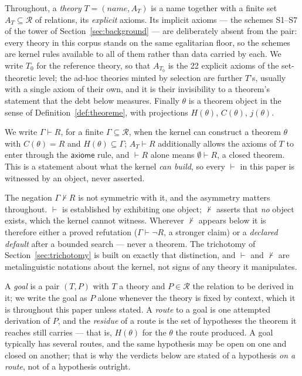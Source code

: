 \documentclass[11pt]{article}
\theoremstyle{remark}\newtheorem{example}{Example}
\begin{document}
Throughout, a \emph{theory} $T = (\mathit{name}, A_T)$ is a name together with a finite
set $A_T \subseteq \mathcal{R}$ of relations, its \emph{explicit} axioms. Its implicit
axioms --- the schemes S1--S7 of the tower of Section~\ref{sec:background} --- are
deliberately absent from the pair: every theory in this corpus stands on the same
egalitarian floor, so the schemes are kernel rules available to all of them rather than
data carried by each. We write $T_0$ for the reference theory, so that $A_{T_0}$ is the
22 explicit axioms of the set-theoretic level; the ad-hoc theories minted by
selection are further $T$'s, usually with a single axiom of their own, and it is their
invisibility to a theorem's statement that the debt below measures. Finally $\theta$ is
a theorem object in the sense of Definition~\ref{def:theoreme}, with projections
$H(\theta)$, $C(\theta)$, $j(\theta)$.

We write $\Gamma \vdash R$, for a finite $\Gamma \subseteq \mathcal{R}$, when the
kernel can construct a theorem $\theta$ with $C(\theta) = R$ and
$H(\theta) \subseteq \Gamma$; $A_T \vdash R$ additionally allows the axioms of $T$ to
enter through the $\mathsf{axiome}$ rule, and $\vdash R$ alone means $\emptyset \vdash R$,
a closed theorem. This is a statement about what the kernel \emph{can build}, so every
$\vdash$ in this paper is witnessed by an object, never asserted.

The negation $\Gamma \nvdash R$ is not symmetric with it, and the asymmetry matters
throughout. $\vdash$ is established by exhibiting one object; $\nvdash$ asserts that
\emph{no} object exists, which the kernel cannot witness. Wherever $\nvdash$ appears
below it is therefore either a proved refutation ($\Gamma \vdash \neg R$, a stronger
claim) or a \emph{declared default} after a bounded search --- never a theorem. The
trichotomy of Section~\ref{sec:trichotomy} is built on exactly that distinction, and
$\vdash$ and $\nvdash$ are metalinguistic notations about the kernel, not signs of any
theory it manipulates.

A \emph{goal} is a pair $(T, P)$ with $T$ a theory and $P \in \mathcal{R}$ the relation
to be derived in it; we write the goal as $P$ alone whenever the theory is fixed by
context, which it is throughout this paper unless stated. A \emph{route} to a goal is
one attempted derivation of $P$, and the \emph{residue} of a route is the set of
hypotheses the theorem it reaches still carries --- that is, $H(\theta)$ for the
$\theta$ the route produced. A goal typically has several routes,
and the same hypothesis may be open on one and closed on another; that is why the
verdicts below are stated of a hypothesis \emph{on a route}, not of a hypothesis
outright.
\end{document}
